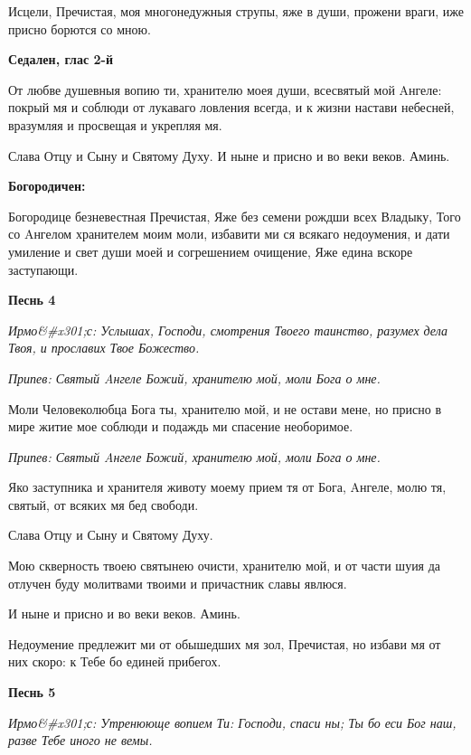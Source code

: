 Исцели, Пречистая, моя многонедужныя струпы, яже в души, прожени враги, иже присно борются со мною.




\bfseries Седален, глас 2-й\normalfont{}


От любве душевныя вопию ти, хранителю моея души, всесвятый мой Aнгеле: покрый мя и соблюди от лукаваго ловления всегда, и к жизни настави небесней, вразумляя и просвещая и укрепляя мя.


Слава Отцу и Сыну и Святому Духу. И ныне и присно и во веки веков. Аминь.




\bfseries Богородичен:\normalfont{}


Богородице безневестная Пречистая, Яже без семени рождши всех Владыку, Того со Aнгелом хранителем моим моли, избавити ми ся всякаго недоумения, и дати умиление и свет души моей и согрешением очищение, Яже едина вскоре заступающи.




\bfseries Песнь 4\normalfont{}


\itshape Ирмо&#x301;с:\normalfont{} Услышах, Господи, смотрения Твоего таинство, разумех дела Твоя, и прославих Твое Божество.


\itshape Припев:\normalfont{} Святый Aнгеле Божий, хранителю мой, моли Бога о мне.


Моли Человеколюбца Бога ты, хранителю мой, и не остави мене, но присно в мире житие мое соблюди и подаждь ми спасение необоримое.


\itshape Припев:\normalfont{} Святый Aнгеле Божий, хранителю мой, моли Бога о мне.


Яко заступника и хранителя животу моему прием тя от Бога, Aнгеле, молю тя, святый, от всяких мя бед свободи.


Слава Отцу и Сыну и Святому Духу.


Мою скверность твоею святынею очисти, хранителю мой, и от части шуия да отлучен буду молитвами твоими и причастник славы явлюся.


И ныне и присно и во веки веков. Аминь.


Недоумение предлежит ми от обышедших мя зол, Пречистая, но избави мя от них скоро: к Тебе бо единей прибегох.




\bfseries Песнь 5\normalfont{}


\itshape Ирмо&#x301;с:\normalfont{} Утренююще вопием Ти: Господи, спаси ны; Ты бо еси Бог наш, разве Тебе иного не вемы.


